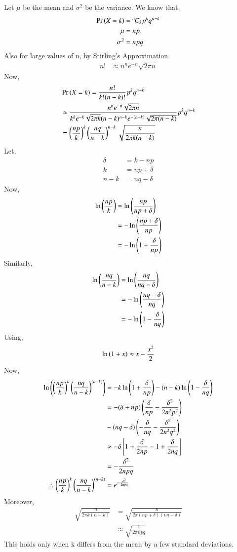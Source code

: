\documentclass[journal,12pt,twocolumn]{IEEEtran}
\newcommand{\permcomb}[4][0mu]{{{}^{#3}\mkern#1#2_{#4}}}
\newcommand{\comb}[1][-1mu]{\permcomb[#1]{C}}
\begin{document}
\begin{enumerate}
Let $\mu$ be the mean and $\sigma^2$ be the variance.
We know that,
\begin{align}
    \pr{X=k} &= \comb{n}{k}p^kq^{n-k}\\
    \mu &= np\\
    \sigma^2 &= npq
\end{align}
Also for large values of n, by Stirling's Approximation.
\begin{align}
    n! &\approx n^n e^{-n} \sqrt{2\pi n}
\end{align}
Now,
\begin{align}
    &\Pr\left(X = k\right) = \frac{n!}{k!(n-k)!}p^kq^{n-k}\\
    &\approx \frac{n^n e^{-n} \sqrt{2\pi n}}{k^k e^{-k} \sqrt{2\pi k} (n-k)^{n-k} e^{-(n-k)} \sqrt{2\pi (n-k)}} p^k q^{n-k}\\
    &= \left(\frac{np}{k}\right)^k \left(\frac{nq}{n-k}\right)^{n-k} \sqrt{\frac{n}{2\pi k(n-k)}}
\end{align}
Let,
\begin{align}
    \delta &= k - np\\  
    k &= np + \delta\\
    n-k &= nq -\delta
\end{align}
Now,
\begin{align}
    \ln{\ensuremath{\left(\frac{np}{k}\right)}}&= \ln{\ensuremath{\left(\frac{np}{np+\delta}\right)}}\\
    &= -\ln{\ensuremath{\left(\frac{np+\delta}{np}\right)}}\\
    &= -\ln{\ensuremath{\left(1+\frac{\delta}{np}\right)}}
\end{align}
Similarly,
\begin{align}
    \ln{\ensuremath{\left(\frac{nq}{n-k}\right)}}&= \ln{\ensuremath{\left(\frac{nq}{nq-\delta}\right)}}\\
    &= -\ln{\ensuremath{\left(\frac{nq-\delta}{nq}\right)}}\\
    &= -\ln{\ensuremath{\left(1-\frac{\delta}{nq}\right)}}
\end{align}
Using,
\begin{align}
    \ln{\ensuremath{\left(1+x\right)}} \approx x-\frac{x^2}{2}
\end{align}
Now,
\begin{align}
    \ln{\ensuremath{\left(\left(\frac{np}{k}\right)^k \left(\frac{nq}{n-k}\right)^{(n-k)}\right)}}&=-k\ln{\ensuremath{\left(1+\frac{\delta}{np}\right)}}-(n-k)\ln{\ensuremath{\left(1-\frac{\delta}{nq}\right)}}\\
    &=-(\delta + np)\left(\frac{\delta}{np}-\frac{\delta^2}{2n^2 p^2}\right)\nonumber\\
    &-(nq-\delta)\left(-\frac{\delta}{nq}-\frac{\delta^2}{2n^2q^2}\right)\\
    &\approx -\delta {}\left[1+\frac{\delta}{2np}-1+\frac{\delta}{2nq}\right]\\
    &= - \frac{\delta^2}{2npq}\\
    \therefore \left(\frac{np}{k}\right)^k \left(\frac{nq}{n-k}\right)^{(n-k)}&=e^{-\frac{\delta^2}{2npq}}
\end{align}
Moreover,
\begin{align}
    \sqrt{\frac{n}{2\pi k(n-k)}} &= \sqrt{\frac{n}{2\pi (np+\delta)(nq-\delta)}}\\
    &\approx \sqrt{\frac{1}{2\pi npq}}
\end{align}
This holds only when k differs from the mean by a few standard deviations.


\end{enumerate}
\end{document}
